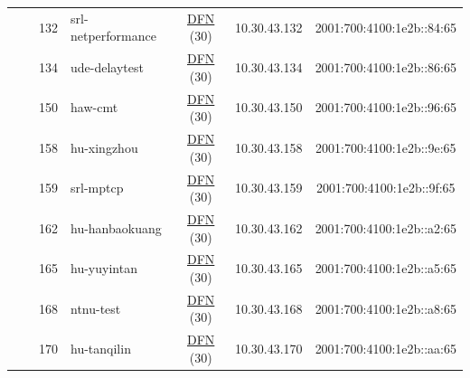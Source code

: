 \begin{small}
\begin{center}
\begin{longtable}{|c|c|c|c|c|c|c|c|}
  &  & \tiny{132} & \multicolumn{1}{|l|}{\tiny{srl-netperformance}} & \multicolumn{2}{|c|}{\tiny{\href{https://www.dfn.de}{DFN} (30)}} & \tiny{10.30.43.132} & \tiny{2001:700:4100:1e2b::84:65} \\* \cline{3-3}\cline{4-4}\cline{5-5}\cline{6-6}\cline{7-7}\cline{8-8}
  &  & \tiny{134} & \multicolumn{1}{|l|}{\tiny{ude-delaytest}} & \multicolumn{2}{|c|}{\tiny{\href{https://www.dfn.de}{DFN} (30)}} & \tiny{10.30.43.134} & \tiny{2001:700:4100:1e2b::86:65} \\* \cline{3-3}\cline{4-4}\cline{5-5}\cline{6-6}\cline{7-7}\cline{8-8}
  &  & \tiny{150} & \multicolumn{1}{|l|}{\tiny{haw-cmt}} & \multicolumn{2}{|c|}{\tiny{\href{https://www.dfn.de}{DFN} (30)}} & \tiny{10.30.43.150} & \tiny{2001:700:4100:1e2b::96:65} \\* \cline{3-3}\cline{4-4}\cline{5-5}\cline{6-6}\cline{7-7}\cline{8-8}
  &  & \tiny{158} & \multicolumn{1}{|l|}{\tiny{hu-xingzhou}} & \multicolumn{2}{|c|}{\tiny{\href{https://www.dfn.de}{DFN} (30)}} & \tiny{10.30.43.158} & \tiny{2001:700:4100:1e2b::9e:65} \\* \cline{3-3}\cline{4-4}\cline{5-5}\cline{6-6}\cline{7-7}\cline{8-8}
  &  & \tiny{159} & \multicolumn{1}{|l|}{\tiny{srl-mptcp}} & \multicolumn{2}{|c|}{\tiny{\href{https://www.dfn.de}{DFN} (30)}} & \tiny{10.30.43.159} & \tiny{2001:700:4100:1e2b::9f:65} \\* \cline{3-3}\cline{4-4}\cline{5-5}\cline{6-6}\cline{7-7}\cline{8-8}
  &  & \tiny{162} & \multicolumn{1}{|l|}{\tiny{hu-hanbaokuang}} & \multicolumn{2}{|c|}{\tiny{\href{https://www.dfn.de}{DFN} (30)}} & \tiny{10.30.43.162} & \tiny{2001:700:4100:1e2b::a2:65} \\* \cline{3-3}\cline{4-4}\cline{5-5}\cline{6-6}\cline{7-7}\cline{8-8}
  &  & \tiny{165} & \multicolumn{1}{|l|}{\tiny{hu-yuyintan}} & \multicolumn{2}{|c|}{\tiny{\href{https://www.dfn.de}{DFN} (30)}} & \tiny{10.30.43.165} & \tiny{2001:700:4100:1e2b::a5:65} \\* \cline{3-3}\cline{4-4}\cline{5-5}\cline{6-6}\cline{7-7}\cline{8-8}
  &  & \tiny{168} & \multicolumn{1}{|l|}{\tiny{ntnu-test}} & \multicolumn{2}{|c|}{\tiny{\href{https://www.dfn.de}{DFN} (30)}} & \tiny{10.30.43.168} & \tiny{2001:700:4100:1e2b::a8:65} \\* \cline{3-3}\cline{4-4}\cline{5-5}\cline{6-6}\cline{7-7}\cline{8-8}
  &  & \tiny{170} & \multicolumn{1}{|l|}{\tiny{hu-tanqilin}} & \multicolumn{2}{|c|}{\tiny{\href{https://www.dfn.de}{DFN} (30)}} & \tiny{10.30.43.170} & \tiny{2001:700:4100:1e2b::aa:65} \\* \cline{3-3}\cline{4-4}\cline{5-5}\cline{6-6}\cline{7-7}\cline{8-8}

\end{longtable}
\end{center}
\end{small}
